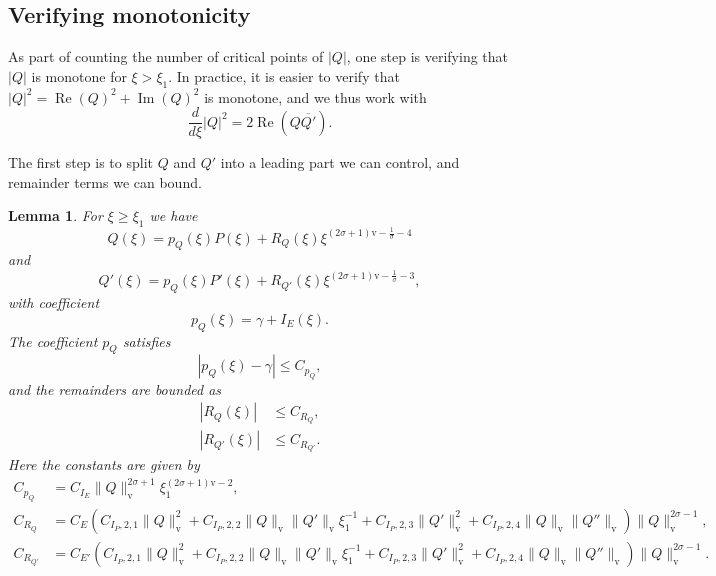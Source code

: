 \documentclass[11pt]{article}
\DeclareMathOperator{\real}{Re}
\DeclareMathOperator{\imag}{Im}
\newcommand{\conj}[1]{\overline{#1}}
\newcommand{\normv}{\mathrm{v}}
\newtheorem{lemma}[definition]{Lemma}
\begin{document}
\subsection{Verifying monotonicity}\label{sec:verify-monotonicity}
As part of counting the number of critical points of \(|Q|\), one step
is verifying that \(|Q|\) is monotone for \(\xi > \xi_{1}\). In
practice, it is easier to verify that
\(|Q|^{2} = \real(Q)^{2} + \imag(Q)^{2}\) is monotone, and we thus
work with
\begin{equation*}
  \frac{d}{d\xi}|Q|^{2} = 2\real(Q\conj{Q'}).
\end{equation*}

The first step is to split \(Q\) and \(Q'\) into a leading part we can
control, and remainder terms we can bound.
\begin{lemma}\label{lemma:Q-expansion}
  For \(\xi \geq \xi_{1}\) we have
  \begin{equation*}
    Q(\xi) = p_{Q}(\xi)P(\xi)
    + R_{Q}(\xi)\xi^{(2\sigma + 1)\normv - \frac{1}{\sigma} - 4}
  \end{equation*}
  and
  \begin{equation*}
    Q'(\xi) = p_{Q}(\xi)P'(\xi)
    + R_{Q'}(\xi)\xi^{(2\sigma + 1)\normv - \frac{1}{\sigma} - 3},
  \end{equation*}
  with coefficient
  \begin{equation*}
    p_{Q}(\xi) = \gamma + I_{E}(\xi).
  \end{equation*}
  The coefficient \(p_{Q}\) satisfies
  \begin{equation*}
    |p_{Q}(\xi) - \gamma| \leq C_{p_{Q}},
  \end{equation*}
  and the remainders are bounded as
  \begin{align*}
    |R_{Q}(\xi)| &\leq C_{R_{Q}},\\
    |R_{Q'}(\xi)| &\leq C_{R_{Q'}}.
  \end{align*}
  Here the constants are given by
  \begin{align*}
    C_{p_{Q}}
    &= C_{I_{E}}\|Q\|_{\normv}^{2\sigma + 1}\xi_{1}^{(2\sigma + 1)\normv - 2},\\
    C_{R_{Q}}
    &= C_{E}\left(
      C_{I_{P},2,1}\|Q\|_{\normv}^{2}
      + C_{I_{P},2,2}\|Q\|_{\normv}\|Q'\|_{\normv}\xi_{1}^{-1}
      + C_{I_{P},2,3}\|Q'\|_{\normv}^{2}
      + C_{I_{P},2,4}\|Q\|_{\normv}\|Q''\|_{\normv}
      \right)\|Q\|_{\normv}^{2\sigma - 1},\\
    C_{R_{Q'}}
    &= C_{E'}\left(
      C_{I_{P},2,1}\|Q\|_{\normv}^{2}
      + C_{I_{P},2,2}\|Q\|_{\normv}\|Q'\|_{\normv}\xi_{1}^{-1}
      + C_{I_{P},2,3}\|Q'\|_{\normv}^{2}
      + C_{I_{P},2,4}\|Q\|_{\normv}\|Q''\|_{\normv}
      \right)\|Q\|_{\normv}^{2\sigma - 1}.
  \end{align*}
\end{lemma}
\end{document}
